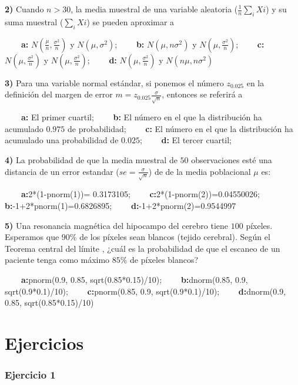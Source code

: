 \documentclass[
]{book}
\begin{document}
\textbf{2)} Cuando \(n>30\), la media muestral de una variable aleatoria (\(\frac{1}{n}\sum_i Xi\)) y su suma muestral (\(\sum_i Xi\)) se pueden aproximar a

\textbf{\(\qquad\)a:} \(N(\frac{\mu}{n}, \frac{\sigma^2}{n})\) y \(N(\mu, \sigma^2)\);
\textbf{\(\qquad\)b:} \(N(\mu, n\sigma^2)\) y \(N(\mu, \frac{\sigma^2}{n})\);
\textbf{\(\qquad\)c:} \(N(\mu, \frac{\sigma^2}{n})\) y \(N(\mu, \frac{\sigma^2}{n})\);
\textbf{\(\qquad\)d:} \(N(\mu, \frac{\sigma^2}{n})\) y \(N(n\mu, n\sigma^2)\)

\textbf{3)} Para una variable normal estándar, si ponemos el número \(z_{0.025}\) en la definición del margen de error \(m=z_{0.025} \frac{\sigma}{\sqrt{n}}\), entonces se referirá a

\textbf{\(\qquad\)a:} El primer cuartil; \textbf{\(\qquad\)b:} El número en el que la distribución ha acumulado \(0.975\) de probabilidad; \textbf{\(\qquad\)c:} El número en el que la distribución ha acumulado una probabilidad de \(0.025\); \textbf{\(\qquad\)d:} El tercer cuartil;

\textbf{4)} La probabilidad de que la media muestral de \(50\) observaciones esté una distancia de un error estandar (\(se=\frac{\sigma}{\sqrt{n}}\)) de de la media poblacional \(\mu\) es:

\textbf{\(\qquad\)a:}2*(1-pnorm(1))= 0.3173105; \textbf{\(\qquad\)c:}2*(1-pnorm(2))=0.04550026;
\textbf{\(\qquad\)b:}-1+2*pnorm(1)=0.6826895;
\textbf{\(\qquad\)d:}-1+2*pnorm(2)=0.9544997

\textbf{5)} Una resonancia magnética del hipocampo del cerebro tiene \(100\) píxeles. Esperamos que \(90\%\) de los píxeles sean blancos (tejido cerebral). Según el Teorema central del límite , ¿cuál es la probabilidad de que el escaneo de un paciente tenga como máximo \(85\%\) de píxeles blancos?

\textbf{\(\qquad\)a:}pnorm(0.9, 0.85, sqrt(0.85*0.15)/10); \textbf{\(\qquad\)b:}dnorm(0.85, 0.9,
sqrt(0.9*0.1)/10); \textbf{\(\qquad\)c:}pnorm(0.85, 0.9, sqrt(0.9*0.1)/10); \textbf{\(\qquad\)d:}dnorm(0.9, 0.85, sqrt(0.85*0.15)/10)

\hypertarget{ejercicios-9}{%
\section{Ejercicios}\label{ejercicios-9}}

\hypertarget{ejercicio-1-8}{%
\subsubsection{Ejercicio 1}\label{ejercicio-1-8}}
\end{document}

